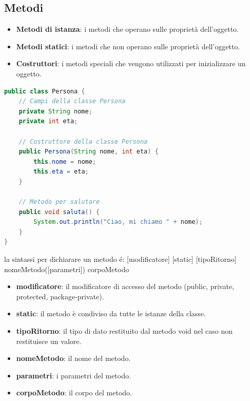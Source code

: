\documentclass[11pt]{article}
\begin{document}
\subsection{Metodi}
\begin{itemize}
    \item \textbf{Metodi di istanza}: i metodi che operano sulle proprietà dell'oggetto.
    \item \textbf{Metodi statici}: i metodi che non operano sulle proprietà dell'oggetto.
    \item \textbf{Costruttori}: i metodi speciali che vengono utilizzati per inizializzare un oggetto.
\end{itemize}
\begin{lstlisting}[language=Java]
public class Persona {
    // Campi della classe Persona
    private String nome;
    private int eta;

    // Costruttore della classe Persona
    public Persona(String nome, int eta) {
        this.nome = nome;
        this.eta = eta;
    }

    // Metodo per salutare
    public void saluta() {
        System.out.println("Ciao, mi chiamo " + nome);
    }
}
\end{lstlisting}
la sintassi per dichiarare un metodo é:
[modificatore] [static] [tipoRitorno] nomeMetodo([parametri]) { corpoMetodo }
\begin{itemize}
    \item \textbf{modificatore}: il modificatore di accesso del metodo (public, private, protected, package-private).
    \item \textbf{static}: il metodo è condiviso da tutte le istanze della classe.
    \item \textbf{tipoRitorno}: il tipo di dato restituito dal metodo void nel caso non restituisce un valore.
    \item \textbf{nomeMetodo}: il nome del metodo.
    \item \textbf{parametri}: i parametri del metodo.
    \item \textbf{corpoMetodo}: il corpo del metodo.
\end{itemize}
\end{document}
